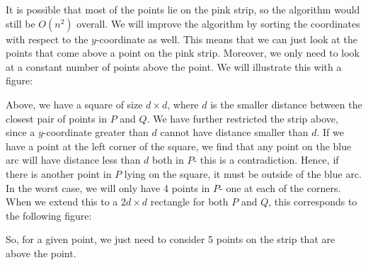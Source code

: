 \documentclass[a4paper, openany]{memoir}
\begin{document}
It is possible that most of the points lie on the pink strip, so the algorithm would still be $O(n^2)$ overall. We will improve the algorithm by sorting the coordinates with respect to the $y$-coordinate as well. This means that we can just look at the points that come above a point on the pink strip. Moreover, we only need to look at a constant number of points above the point. We will illustrate this with a figure:
\begin{figure}[H]
    \centering
\end{figure}
\noindent Above, we have a square of size $d \times d$, where $d$ is the smaller distance between the closest pair of points in $P$ and $Q$. We have further restricted the strip above, since a $y$-coordinate greater than $d$ cannot have distance smaller than $d$. If we have a point at the left corner of the square, we find that any point on the blue arc will have distance less than $d$ both in $P$- this is a contradiction. Hence, if there is another point in $P$ lying on the square, it must be outside of the blue arc. In the worst case, we will only have 4 points in $P$- one at each of the corners. When we extend this to a $2d \times d$ rectangle for both $P$ and $Q$, this corresponds to the following figure:
\begin{figure}[H]
    \centering
\end{figure}
\noindent So, for a given point, we just need to consider 5 points on the strip that are above the point.
\end{document}
